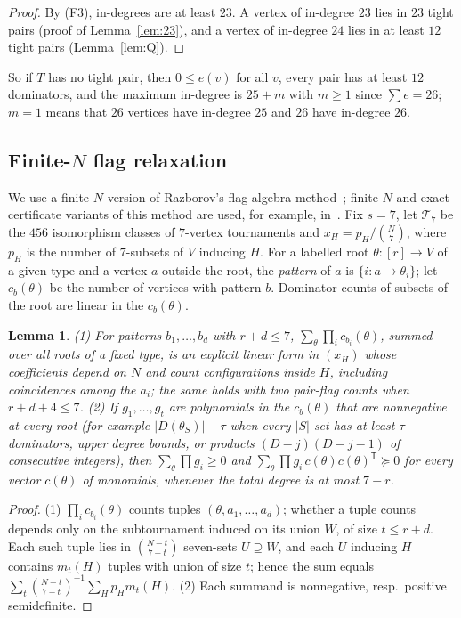\documentclass[11pt]{amsart}
\newtheorem{lemma}[theorem]{Lemma}
\theoremstyle{definition}
\theoremstyle{remark}
\newcommand{\D}{D}
\newcommand{\abs}[1]{\lvert #1\rvert}
\begin{document}
\begin{proof}
By (F3), in-degrees are at least $23$. A vertex of in-degree $23$ lies in $23$ tight pairs (proof of Lemma~\ref{lem:23}), and a vertex
of in-degree $24$ lies in at least $12$ tight pairs (Lemma~\ref{lem:Q}).
\end{proof}

So if $T$ has no tight pair, then $0\le e(v)$ for all $v$, every pair has at least $12$ dominators, and the maximum in-degree is
$25+m$ with $m\ge1$ since $\sum e=26$; $m=1$ means that $26$ vertices have in-degree $25$ and $26$ have in-degree $26$.

\subsection{\texorpdfstring{Finite-$N$ flag relaxation}{Finite-N flag relaxation}}
We use a finite-$N$ version of Razborov's flag algebra method~\cite{Raz07}; finite-$N$ and exact-certificate variants of this
method are used, for example, in~\cite{LP21}. Fix $s=7$, let $\mathcal T_7$ be the $456$ isomorphism classes of $7$-vertex
tournaments and $x_H=p_H/\binom N7$, where $p_H$ is the number of $7$-subsets of $V$ inducing $H$. For a labelled root
$\theta:[r]\to V$ of a given type and a vertex $a$ outside the root, the \emph{pattern} of $a$ is $\{i:a\to\theta_i\}$; let $c_b(\theta)$
be the number of vertices with pattern $b$. Dominator counts of subsets of the root are linear in the $c_b(\theta)$.

\begin{lemma}\label{lem:flag}
(1) For patterns $b_1,\dots,b_d$ with $r+d\le7$, $\sum_\theta\prod_ic_{b_i}(\theta)$, summed over all roots of a fixed type, is an
explicit linear form in $(x_H)$ whose coefficients depend on $N$ and count configurations inside $H$, including coincidences among the
$a_i$; the same holds with two pair-flag counts when $r+d+4\le7$.
(2) If $g_1,\dots,g_t$ are polynomials in the $c_b(\theta)$ that are nonnegative at every root (for example $\abs{\D(\theta_S)}-\tau$
when every $\abs S$-set has at least $\tau$ dominators, upper degree bounds, or products $(D-j)(D-j-1)$ of consecutive integers),
then $\sum_\theta\prod g_i\ge0$ and $\sum_\theta\prod g_i\,c(\theta)c(\theta)^{\mathsf T}\succeq0$ for every vector $c(\theta)$ of
monomials, whenever the total degree is at most $7-r$.
\end{lemma}

\begin{proof}
(1) $\prod_ic_{b_i}(\theta)$ counts tuples $(\theta,a_1,\dots,a_d)$; whether a tuple counts depends only on the subtournament induced
on its union $W$, of size $t\le r+d$. Each such tuple lies in $\binom{N-t}{7-t}$ seven-sets $U\supseteq W$, and each $U$ inducing $H$
contains $m_t(H)$ tuples with union of size $t$; hence the sum equals
$\sum_t\binom{N-t}{7-t}^{-1}\sum_Hp_Hm_t(H)$. (2) Each summand is nonnegative, resp.\ positive semidefinite.
\end{proof}
\end{document}
